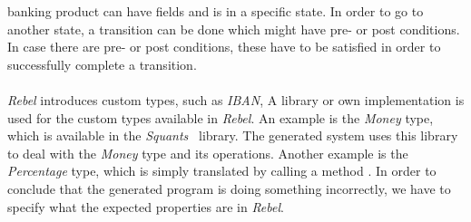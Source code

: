 banking product can have fields and is in a specific state. In order to go to
another state, a transition can be done which might have pre- or post conditions.
In case there are pre- or post conditions, these have to be satisfied in order to
successfully complete a transition.\\
\\
\textit{Rebel} introduces custom types, such as \textit{IBAN},
A library or own implementation is used for the custom types available in \textit{Rebel}. An
example is the \textit{Money} type, which is available in the
\textit{Squants}~\cite{siteSquants2017} library. The generated system uses this
library to deal with the \textit{Money} type and its operations. Another example
is the \textit{Percentage} type, which is simply translated by calling a method
. In order to conclude that the generated program is doing
something incorrectly, we have to specify what the expected properties are in
\textit{Rebel}.


